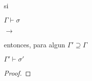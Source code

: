 \begin{theorem}[Preservacion]
    si


    $\Gamma \vdash \sigma$

      $\rightarrow$ 

    entonces, para algun $\Gamma' \supseteq  \Gamma$


    $\Gamma' \vdash \sigma'$

\end{theorem}

\begin{proof}

\end{proof}

